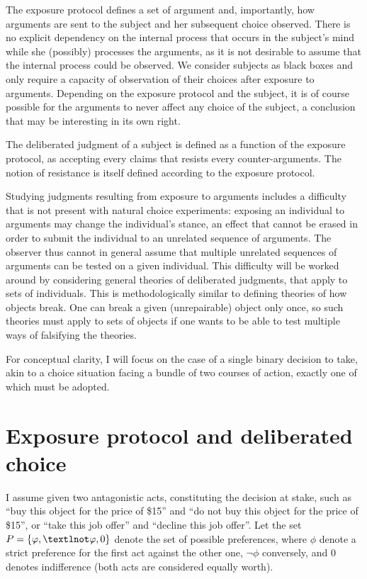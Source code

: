 \documentclass[version=last, pagesize, twoside=off, bibliography=totoc, DIV=calc, fontsize=12pt, a4paper, french, english]{scrartcl}
\begin{document}
The exposure protocol defines a set of argument and, importantly, how arguments are sent to the subject and her subsequent choice observed. There is no explicit dependency on the internal process that occurs in the subject’s mind while she (possibly) processes the arguments, as it is not desirable to assume that the internal process could be observed. We consider subjects as black boxes and only require a capacity of observation of their choices after exposure to arguments. Depending on the exposure protocol and the subject, it is of course possible for the arguments to never affect any choice of the subject, a conclusion that may be interesting in its own right.

The deliberated judgment of a subject is defined as a function of the exposure protocol, as accepting every claims that resists every counter-arguments. The notion of resistance is itself defined according to the exposure protocol.

Studying judgments resulting from exposure to arguments includes a difficulty that is not present with natural choice experiments: exposing an individual to arguments may change the individual’s stance, an effect that cannot be erased in order to submit the individual to an unrelated sequence of arguments. The observer thus cannot in general assume that multiple unrelated sequences of arguments can be tested on a given individual. This difficulty will be worked around by considering general theories of deliberated judgments, that apply to sets of individuals. This is methodologically similar to defining theories of how objects break. One can break a given (unrepairable) object only once, so such theories must apply to sets of objects if one wants to be able to test multiple ways of falsifying the theories.

For conceptual clarity, I will focus on the case of a single binary decision to take, akin to a choice situation facing a bundle of two courses of action, exactly one of which must be adopted.

\section{Exposure protocol and deliberated choice}
I assume given two antagonistic acts, constituting the decision at stake, such as “buy this object for the price of \$15” and “do not buy this object for the price of \$15”, or “take this job offer” and “decline this job offer”.
Let the set $P = \set{\phi, ¬\phi, 0}$ denote the set of possible preferences, where $\phi$ denote a strict preference for the first act against the other one, $¬\phi$ conversely, and $0$ denotes indifference (both acts are considered equally worth).
\end{document}
